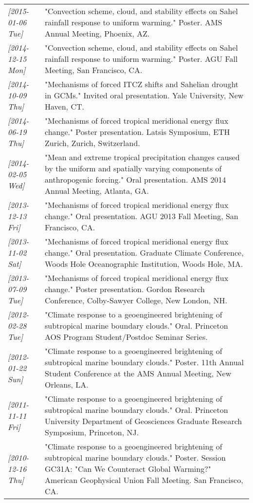 \documentclass[12pt,letterpaper]{shillcv}
\begin{document}
\begin{center}
\begin{tabularx}{\textwidth}{lX}
\textit{[2015-01-06 Tue]} & "Convection scheme, cloud, and stability effects on Sahel rainfall response to uniform warming."  Poster.  AMS Annual Meeting, Phoenix, AZ.\\
\textit{[2014-12-15 Mon]} & "Convection scheme, cloud, and stability effects on Sahel rainfall response to uniform warming."  Poster.  AGU Fall Meeting, San Francisco, CA.\\
\textit{[2014-10-09 Thu]} & "Mechanisms of forced ITCZ shifts and Sahelian drought in GCMs."  Invited oral presentation.  Yale University, New Haven, CT.\\
\textit{[2014-06-19 Thu]} & "Mechanisms of forced tropical meridional energy flux change."  Poster presentation.  Latsis Symposium, ETH Zurich, Zurich, Switzerland.\\
\textit{[2014-02-05 Wed]} & "Mean and extreme tropical precipitation changes caused by the uniform and spatially varying components of anthropogenic forcing."  Oral presentation.  AMS 2014 Annual Meeting, Atlanta, GA.\\
\textit{[2013-12-13 Fri]} & "Mechanisms of forced tropical meridional energy flux change."  Oral presentation.  AGU 2013 Fall Meeting, San Francisco, CA.\\
\textit{[2013-11-02 Sat]} & "Mechanisms of forced tropical meridional energy flux change."  Oral presentation.  Graduate Climate Conference, Woods Hole Oceanographic Institution, Woods Hole, MA.\\
\textit{[2013-07-09 Tue]} & "Mechanisms of forced tropical meridional energy flux change."  Poster presentation.  Gordon Research Conference, Colby-Sawyer College, New London, NH.\\
\textit{[2012-02-28 Tue]} & "Climate response to a geoengineered brightening of subtropical marine boundary clouds."  Oral.  Princeton AOS Program Student/Postdoc Seminar Series.\\
\textit{[2012-01-22 Sun]} & "Climate response to a geoengineered brightening of subtropical marine boundary clouds."  Poster.  11th Annual Student Conference at the AMS Annual Meeting, New Orleans, LA.\\
\textit{[2011-11-11 Fri]} & "Climate response to a geoengineered brightening of subtropical marine boundary clouds."  Oral.  Princeton University Department of Geosciences Graduate Research Symposium, Princeton, NJ.\\
\textit{[2010-12-16 Thu]} & "Climate response to a geoengineered brightening of subtropical marine boundary clouds."  Poster.  Session GC31A: "Can We Counteract Global Warming?" American Geophysical Union Fall Meeting.  San Francisco, CA.\\

\end{tabularx}
\end{center}
\end{document}
